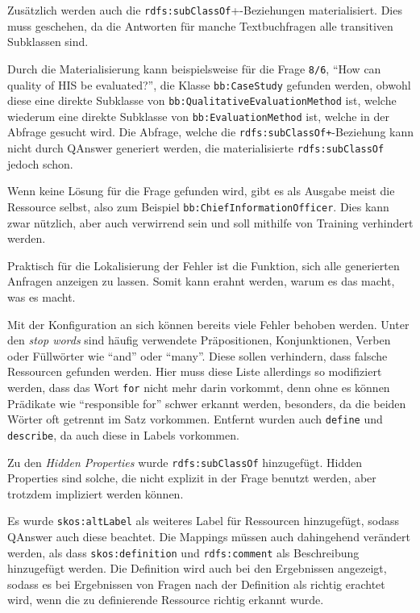 \documentclass[utf8,biblatex]{lni}
\begin{document}
Zusätzlich werden auch die \texttt{rdfs:subClassOf}+-Beziehungen materialisiert.
Dies muss geschehen, da die Antworten für manche Textbuchfragen alle transitiven Subklassen sind.

Durch die Materialisierung kann beispielsweise für die Frage \texttt{8/6}, \enquote{How can quality of HIS be evaluated?},
die Klasse \texttt{bb:CaseStudy} gefunden werden, obwohl diese eine direkte Subklasse von \texttt{bb:QualitativeEvaluationMethod} ist,
welche wiederum eine direkte Subklasse von \texttt{bb:EvaluationMethod} ist, welche in der Abfrage gesucht wird.
Die Abfrage, welche die \texttt{rdfs:subClassOf+}-Beziehung kann nicht durch QAnswer generiert werden, die materialisierte \texttt{rdfs:subClassOf} jedoch schon.

Wenn keine Lösung für die Frage gefunden wird, gibt es als Ausgabe meist die Ressource selbst, also zum Beispiel \texttt{bb:ChiefInformationOfficer}.
Dies kann zwar nützlich, aber auch verwirrend sein und soll mithilfe von Training verhindert werden.

Praktisch für die Lokalisierung der Fehler ist die Funktion, sich alle generierten Anfragen anzeigen zu lassen.
Somit kann erahnt werden, warum es das macht, was es macht.

Mit der Konfiguration an sich können bereits viele Fehler behoben werden.
Unter den \emph{stop words} sind häufig verwendete Präpositionen, Konjunktionen, Verben oder Füllwörter wie \enquote{and} oder \enquote{many}.
Diese sollen verhindern, dass falsche Ressourcen gefunden werden.
Hier muss diese Liste allerdings so modifiziert werden, dass das Wort \texttt{for} nicht mehr darin vorkommt, denn ohne es können Prädikate wie \enquote{responsible for} schwer erkannt werden,
besonders, da die beiden Wörter oft getrennt im Satz vorkommen.
Entfernt wurden auch \texttt{define} und \texttt{describe}, da auch diese in Labels vorkommen.

Zu den \emph{Hidden Properties} wurde \texttt{rdfs:subClassOf} hinzugefügt.
Hidden Properties sind solche, die nicht explizit in der Frage benutzt werden, aber trotzdem impliziert werden können.

Es wurde \texttt{skos:altLabel} als weiteres Label für Ressourcen hinzugefügt, sodass QAnswer auch diese beachtet.
Die Mappings müssen auch dahingehend verändert werden, als dass \texttt{skos:definition}
und \texttt{rdfs:comment} als Beschreibung hinzugefügt werden.
Die Definition wird auch bei den Ergebnissen angezeigt, sodass es bei Ergebnissen von Fragen nach der Definition als richtig erachtet wird, wenn die zu definierende Ressource richtig erkannt wurde.
\end{document}
